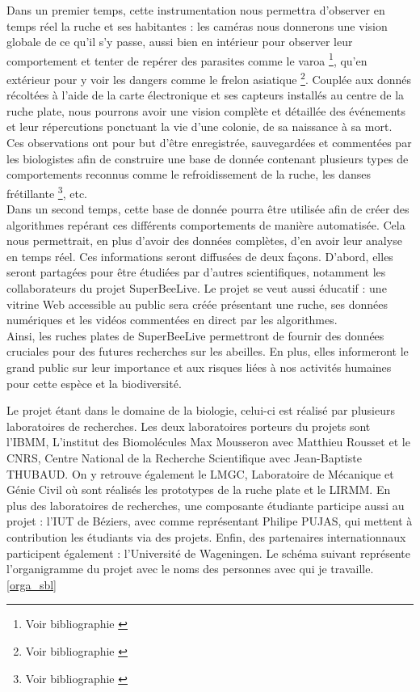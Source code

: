 \documentclass[11pt,french,a4paper]{report}
\begin{document}
\begin{titlepage}
Dans un premier temps, cette instrumentation nous permettra d'observer en temps réel la ruche et ses habitantes : 
les caméras nous donnerons une vision globale de ce qu'il s'y passe, aussi bien en intérieur pour observer leur 
comportement et tenter de repérer des parasites comme le varoa \footnote{Voir bibliographie \cite{ref11}}, 
qu'en extérieur pour y voir les dangers comme le frelon asiatique \footnote{Voir bibliographie \cite{ref12}}.
Couplée aux donnés récoltées à l'aide de la carte électronique et ses capteurs installés au centre de la ruche plate, 
nous pourrons avoir une vision complète et détaillée des événements et leur répercutions ponctuant la vie d'une colonie,
de sa naissance à sa mort. \\
Ces observations ont pour but d'être enregistrée, sauvegardées et commentées par les biologistes afin de construire une base
de donnée contenant plusieurs types de comportements reconnus comme le refroidissement de la ruche, les danses frétillante \footnote{Voir bibliographie \cite{ref10}}, 
etc.  
\\
Dans un second temps, cette base de donnée pourra être utilisée afin de créer des algorithmes repérant ces différents comportements
de manière automatisée. Cela nous permettrait, en plus d'avoir des données complètes, d'en avoir leur analyse en 
temps réel. Ces informations seront diffusées de deux façons. D'abord, elles seront partagées pour être étudiées par d'autres scientifiques, 
notamment les collaborateurs du projet SuperBeeLive. Le projet se veut aussi éducatif : une vitrine Web accessible au public 
sera créée présentant une ruche, ses données numériques et les vidéos commentées en direct par les algorithmes. \\


Ainsi, les ruches plates de SuperBeeLive permettront de fournir des données cruciales pour des futures recherches sur les 
abeilles. En plus, elles informeront le grand public sur leur importance et aux risques liées à nos activités humaines pour 
cette espèce et la biodiversité. 


\subtitle{L'équipe Superbeelive}
Le projet étant dans le domaine de la biologie, celui-ci est réalisé par plusieurs laboratoires de recherches. 
Les deux laboratoires porteurs du projets sont l'IBMM, L'institut des Biomolécules Max Mousseron avec Matthieu Rousset
et le CNRS, Centre National de la Recherche Scientifique avec Jean-Baptiste THUBAUD. On y retrouve également le LMGC, Laboratoire
de Mécanique et Génie Civil où sont réalisés les prototypes de la ruche plate et le LIRMM. 
En plus des laboratoires de recherches, une composante étudiante participe aussi au projet : l'IUT de Béziers, avec comme représentant
Philipe PUJAS, qui mettent à contribution les étudiants via des projets. Enfin, des partenaires internationnaux participent également :
l'Université de Wageningen. 
Le schéma suivant représente l'organigramme du projet avec le noms des personnes avec qui je travaille. \ref{orga_sbl}


\end{titlepage}
\end{document}
